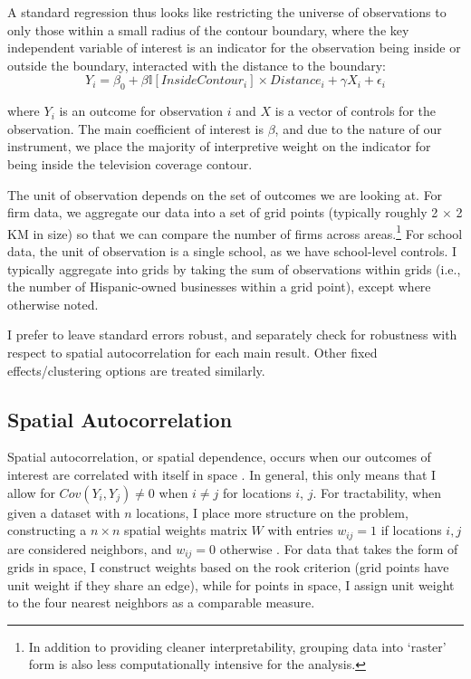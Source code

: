 \documentclass[11pt]{article}
\begin{document}
A standard regression thus looks like restricting the universe of observations to only those within a small radius of the contour boundary, where the key independent variable of interest is an indicator for the observation being inside or outside the boundary, interacted with the distance to the boundary:
\[ Y_i^{} = \beta_0 + \beta \mathbb{I}[InsideContour_i] \times Distance_i + \gamma X_i + \epsilon_i \]

where $Y_i$ is an outcome for observation $i$ and $X$ is a vector of controls for the observation. The main coefficient of interest is $\beta$, and due to the nature of our instrument, we place the majority of interpretive weight on the indicator for being inside the television coverage contour. 

The unit of observation depends on the set of outcomes we are looking at. For firm data, we aggregate our data into a set of grid points (typically roughly 2 $\times$ 2 KM in size) so that we can compare the number of firms across areas.\footnote{ In addition to providing cleaner interpretability, grouping data into `raster' form is also less computationally intensive for the analysis.} For school data, the unit of observation is a single school, as we have school-level controls. I typically aggregate into grids by taking the sum of observations within grids (i.e., the number of Hispanic-owned businesses within a grid point), except where otherwise noted.

I prefer to leave standard errors robust, and separately check for robustness with respect to spatial autocorrelation for each main result. Other fixed effects/clustering options are treated similarly.

\subsection{Spatial Autocorrelation}

Spatial autocorrelation, or spatial dependence, occurs when our outcomes of interest are correlated with itself in space \citep{cliff_spatial_1973}. In general, this only means that I allow for $Cov(Y_i,Y_j) \neq 0$ when $i\neq j$ for locations $i$, $j$. For tractability, when given a dataset with $n$ locations, I place more structure on the problem, constructing a $n \times n$ spatial weights matrix $W$ with entries $w_{ij} = 1$ if locations $i,j$ are considered neighbors, and $w_{ij} = 0$ otherwise \citep{anselin_spatial_1998}. For data that takes the form of grids in space, I construct weights based on the rook criterion (grid points have unit weight if they share an edge), while for points in space, I assign unit weight to the four nearest neighbors as a comparable measure.
\end{document}

